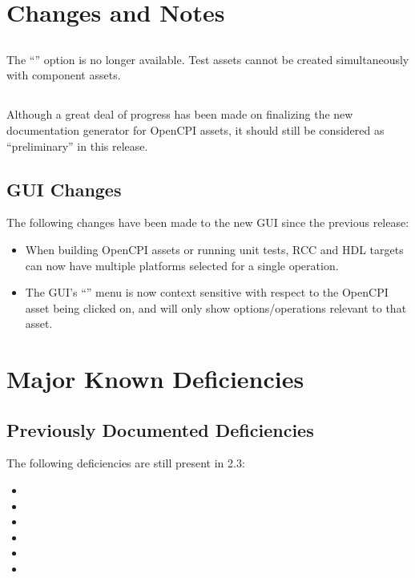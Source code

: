 \section{Changes and Notes}

\subsection{}
\label{sec:23_ocpidev}
The ``'' option is no longer available.  Test assets cannot be created simultaneously with component assets.

\subsection{}
\label{sec:23_ocpidoc}
Although a great deal of progress has been made on finalizing the new documentation generator for OpenCPI assets, it should still be considered as ``preliminary'' in this release.

\subsection{GUI Changes}
\label{sec:23_ie_gui}
The following changes have been made to the new GUI since the previous release:
\begin{itemize}
\setlength\itemsep{0em} %
\item When building OpenCPI assets or running unit tests, RCC and HDL targets can now have multiple platforms selected for a single operation.
\item The GUI's ``'' menu is now context sensitive with respect to the OpenCPI asset being clicked on, and will only show options/operations relevant to that asset.
\end{itemize}

\section{Major Known Deficiencies}
\label{sec:23_bugs}

\subsection{Previously Documented Deficiencies}
The following deficiencies are still present in 2.3:
\begin{itemize}
\setlength\itemsep{0em} %
\item {}
\item {}
\item {}
\item {}
\item {}
\item {}
\end{itemize}

